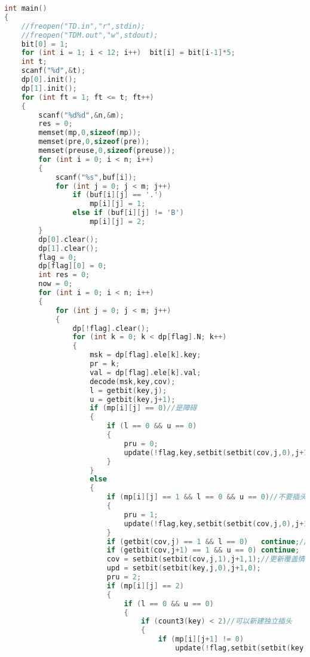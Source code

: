 \begin{lstlisting}[language=c++]
int main()
{
    //freopen("TD.in","r",stdin);
    //freopen("TDM.out","w",stdout);
    bit[0] = 1;
    for (int i = 1; i < 12; i++)  bit[i] = bit[i-1]*5;
    int t;
    scanf("%d",&t);
    dp[0].init();
    dp[1].init();
    for (int ft = 1; ft <= t; ft++)
    {
        scanf("%d%d",&n,&m);
        res = 0;
        memset(mp,0,sizeof(mp));
        memset(pre,0,sizeof(pre));
        memset(preuse,0,sizeof(preuse));
        for (int i = 0; i < n; i++)
        {
            scanf("%s",buf[i]);
            for (int j = 0; j < m; j++)
                if (buf[i][j] == '.')
                    mp[i][j] = 1;
                else if (buf[i][j] != 'B')
                    mp[i][j] = 2;
        }
        dp[0].clear();
        dp[1].clear();
        flag = 0;
        dp[flag][0] = 0;
        int res = 0;
        now = 0;
        for (int i = 0; i < n; i++)
        {
            for (int j = 0; j < m; j++)
            {
                dp[!flag].clear();
                for (int k = 0; k < dp[flag].N; k++)
                {
                    msk = dp[flag].ele[k].key;
                    pr = k;
                    val = dp[flag].ele[k].val;
                    decode(msk,key,cov);
                    l = getbit(key,j);
                    u = getbit(key,j+1);
                    if (mp[i][j] == 0)//是障碍
                    {
                        if (l == 0 && u == 0)
                        {
                            pru = 0;
                            update(!flag,key,setbit(setbit(cov,j,0),j+1,0),val);
                        }
                    }
                    else
                    {
                        if (mp[i][j] == 1 && l == 0 && u == 0)//不要插头
                        {
                            pru = 1;
                            update(!flag,key,setbit(setbit(cov,j,0),j+1,0),val);
                        }
                        if (getbit(cov,j) == 1 && l == 0)   continue;//不可以在这里搞插头
                        if (getbit(cov,j+1) == 1 && u == 0) continue;
                        cov = setbit(setbit(cov,j,1),j+1,1);//更新覆盖情况
                        upd = setbit(setbit(key,j,0),j+1,0);
                        pru = 2;
                        if (mp[i][j] == 2)
                        {
                            if (l == 0 && u == 0)
                            {
                                if (count3(key) < 2)//可以新建独立插头
                                {
                                    if (mp[i][j+1] != 0)
                                        update(!flag,setbit(setbit(key,j,0),j+1,3),cov,val+1);

\end{lstlisting}
